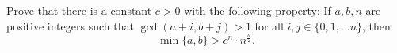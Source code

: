 Prove that there is a constant $c>0$ with the following property: If $a, b, n$ are positive integers such that $\gcd(a+i, b+j)>1$ for all $i, j\in\{0, 1, \ldots n\}$,  then\[\min\{a, b\}>c^n\cdot n^{\frac{n}{2}}.\]